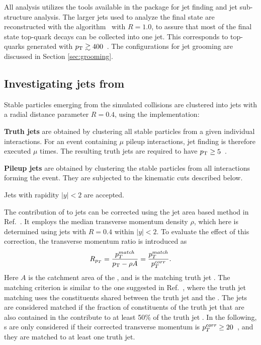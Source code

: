 All analysis utilizes the tools available in the \FJ{} \cite{Cacciari:2011ma} 
package for jet finding and jet sub-structure analysis. The larger jets used 
to analyze the final state are reconstructed with the \antikt{} 
algorithm~\cite{Cacciari:2008gp} with  $R = 1.0$, to assure that most of 
the final state top-quark decays can be collected into one jet. This 
corresponds to top-quarks generated with $p_{\mathrm{T}} \gtrsim 400$~\GeV. 
The configurations for jet grooming are discussed 
in Section \ref{sec:grooming}. 




\subsection{Investigating jets from \pu} \label{sec:investigation}

Stable particles emerging from the simulated \pp{} collisions are clustered into \antikt{} jets \cite{Cacciari:2008gp} with
a radial distance parameter $R=0.4$, using the \FJ{} \cite{Cacciari:2011ma} implementation:
\begin{description}
    \item{\bf Truth jets} are obtained by clustering all stable particles from a given individual \MB{} interactions. For an event containing
        $\mu$ pileup interactions, jet finding is therefore executed $\mu$ times.
	The resulting truth jets are required to have $p_{\mathrm{T}} \geq 5$~\GeV. 
    \item{\bf Pileup jets} are obtained by clustering the stable particles from all \MB{} 
            interactions forming the \pu{} event. They are subjected to the kinematic cuts described below. 
\end{description}
Jets with rapidity $|y|<2$ are accepted.

The contribution of \pu{} to jets can be corrected using the jet area based method in Ref.~\cite{Cacciari:2007fd}. It employs the median transverse momentum density $\rho$, which here is determined using \kT{} jets with $R = 0.4$ within $|y| < 2$.   To evaluate the effect of this correction, the transverse momentum ratio \Rpt{} is introduced as
\begin{equation}
R_{p_T} =\dfrac{p_T^{match}}{p_{\mathrm{T}} - \rho A} = \dfrac{p_T^{match}}{p_T^{corr}}.
\label{eq:match}
\end{equation} 
Here $A$ is the catchment area \cite{Cacciari:2008gn} of the \pujet, and \ptmatch{} is the matching truth jet \pT. The matching criterion is similar to the one suggested in Ref.~\cite{Cacciari:2010te}, where the truth jet matching uses the constituents shared between the truth jet and the \pujet. The jets are considered matched if  the fraction of constituents of the truth jet that are also contained in the \pujet{} contribute to at least 50\% of the truth jet \pT. 
In the following, \pujet s are only considered if their corrected transverse momentum is $p_T^{corr}\geq 20$~\GeV, and they are matched to at least one truth jet. 

